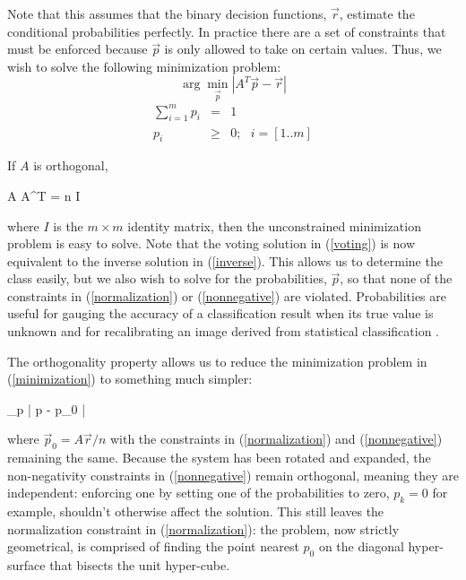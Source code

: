 Note that this assumes that the binary decision functions, $\vec r$,
estimate the conditional probabilities perfectly.
In practice
there are a set of constraints that must be enforced
because $\vec p$ is only allowed to take on certain values.
Thus, we wish to solve the following minimization problem:
\begin{equation}
	\arg \min_{\vec p} | A^T \vec p - \vec r | \label{minimization}
\end{equation}
\begin{eqnarray}
	\sum_{i=1}^m p_i & = & 1 \label{normalization}\\
	p_i & \ge & 0; ~~~ i=[1..m] \label{nonnegative}
\end{eqnarray}

If $A$ is orthogonal,
\begin{eqnnon}
	A A^T = n I
	\label{orthogonal}
\end{eqnnon}
where $I$ is the $m \times m$ identity matrix,
then the unconstrained minimization problem is easy to solve. 
Note that the voting solution in (\ref{voting}) is now equivalent to
the inverse solution in (\ref{inverse}).
This allows us to determine the class easily, but we also wish to solve for
the probabilities, $\vec p$, so that none of the constraints in 
(\ref{normalization}) or (\ref{nonnegative}) are violated.
Probabilities are useful for gauging the accuracy of a classification result
when its true value is unknown and for recalibrating an image derived from
statistical classification \citep{Fawcett2006,Mills2009,Mills2011}.

The orthogonality property allows us to reduce the minimization problem 
in (\ref{minimization}) to something much simpler:
\begin{eqnnon}
	\arg \min_{\vec p} | \vec p - \vec p_0 |
\end{eqnnon}
where $\vec p_0 = A \vec r/n$ with the constraints in (\ref{normalization}) and
(\ref{nonnegative}) remaining the same.
Because the system has been rotated and expanded, the non-negativity 
constraints in (\ref{nonnegative}) remain orthogonal, meaning they are 
independent: enforcing one by setting one of the probabilities to zero, 
$p_k=0$ for example, shouldn't otherwise affect the solution.
This still leaves the normalization constraint in (\ref{normalization}):
the problem, now strictly geometrical, is comprised of finding the point nearest $p_0$ on the diagonal hyper-surface that bisects the unit hyper-cube.

